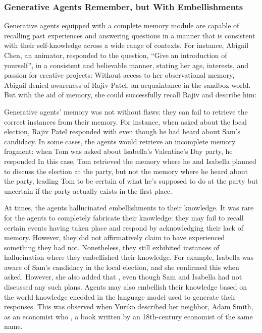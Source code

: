 \subsubsection{Generative Agents Remember, but With Embellishments}
Generative agents equipped with a complete memory module are capable of recalling past experiences and answering questions in a manner that is consistent with their self-knowledge across a wide range of contexts. For instance, Abigail Chen, an animator, responded to the question, ``Give an introduction of yourself'', in a consistent and believable manner, stating her age, interests, and passion for creative projects:  Without access to her observational memory, Abigail denied awareness of Rajiv Patel, an acquaintance in the sandbox world. But with the aid of memory, she could successfully recall Rajiv and describe him: 

Generative agents' memory was not without flaws: they can fail to retrieve the correct instances from their memory. For instance, when asked about the local election, Rajiv Patel responded with  even though he had heard about Sam's candidacy. In some cases, the agents would retrieve an incomplete memory fragment: when Tom was asked about Isabella's Valentine's Day party, he responded  In this case, Tom retrieved the memory where he and Isabella planned to discuss the election at the party, but not the memory where he heard about the party, leading Tom to be certain of what he's supposed to do at the party but uncertain if the party actually exists in the first place.

At times, the agents hallucinated embellishments to their knowledge. It was rare for the agents to completely fabricate their knowledge: they may fail to recall certain events having taken place and respond by acknowledging their lack of memory. However, they did not affirmatively claim to have experienced something they had not. Nonetheless, they still exhibited instances of hallucination where they embellished their knowledge. For example, Isabella was aware of Sam's candidacy in the local election, and she confirmed this when asked. However, she also added that , even though Sam and Isabella had not discussed any such plans. Agents may also embellish their knowledge based on the world knowledge encoded in the language model used to generate their responses. This was observed when Yuriko described her neighbor, Adam Smith, as an economist who , a book written by an 18th-century economist of the same name.

